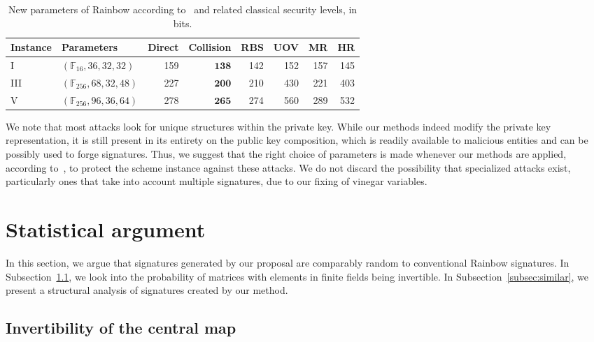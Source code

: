 \documentclass[12pt, a4paper, oneside]{memoir}
\theoremstyle{definition}
\begin{document}
\begin{table}[htbp]
  \centering
  \renewcommand{\arraystretch}{1.2}
  \caption{New parameters of Rainbow according to~\cite[Sec.~4]{Ding:202006} and related classical security levels, in bits.}\label{tab:newsec}
  \begin{tabular}{*{2}{l}*{6}{r}}
    \toprule
    Instance & Parameters & Direct & Collision & RBS & UOV & MR & HR \\
    \midrule
    I    & $(\mathbb{F}_{ 16}, 36, 32, 32)$  &              159 &  $\mathbf{ 138}$ &              142 &              152 &              157 &              145 \\
    III  & $(\mathbb{F}_{256}, 68, 32, 48)$  &              227 &  $\mathbf{ 200}$ &              210 &              430 &              221 &              403 \\
    V    & $(\mathbb{F}_{256}, 96, 36, 64)$  &              278 &  $\mathbf{ 265}$ &              274 &              560 &              289 &              532 \\
    \bottomrule
  \end{tabular}
\end{table}

We note that most attacks look for unique structures within the private key. While our methods indeed modify the private key representation, it is still present in its entirety on the public key composition, which is readily available to malicious entities and can be possibly used to forge signatures. Thus, we suggest that the right choice of parameters is made whenever our methods are applied, according to~\cite{Petzoldt:201005}, to protect the scheme instance against these attacks. We do not discard the possibility that specialized attacks exist, particularly ones that take into account multiple signatures, due to our fixing of vinegar variables.

\section{Statistical argument}\label{sec:stats}

In this section, we argue that signatures generated by our proposal are comparably random to conventional Rainbow signatures. In Subsection~\ref{subsec:invert}, we look into the probability of matrices with elements in finite fields being invertible. In Subsection~\ref{subsec:similar}, we present a structural analysis of signatures created by our method.

\subsection{Invertibility of the central map}\label{subsec:invert}
\end{document}
